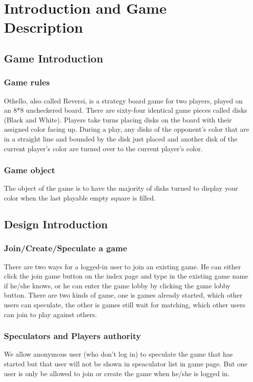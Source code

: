 \section{Introduction and Game Description}
\subsection{Game Introduction}
\subsubsection{Game rules}
Othello, also called Reversi, is a strategy board game for two players, played 
on an 8*8 uncheckered board. There are sixty-four identical game pieces called 
disks (Black and White). Players take turns placing disks on the board with 
their assigned color facing up. During a play, any disks of the opponent's color 
that are in a straight line and bounded by the disk just placed and another disk 
of the current player's color are turned over to the current player's color.

\subsubsection{Game object}
The object of the game is to have the majority of disks turned to display your 
color when the last playable empty square is filled.

\subsection{Design Introduction}

\subsubsection{Join/Create/Speculate a game} There are two ways for a logged-in 
user to join an existing game. He can either 
click the join game button on the index page and type in the existing game name
if he/she knows, or he can enter the game lobby by clicking the 
game lobby button. There are two kinds of game, one is games already started, 
which other users can speculate, the other is games still wait for matching, 
which other users can join to play against others. 

\subsubsection{Speculators and Players authority} We allow anonymous user
(who don't log in) to speculate the game that has started but that user will not
be shown in speaculator list in game page. But one user is only 
be allowed to join or create the game when he/she is logged in. 

